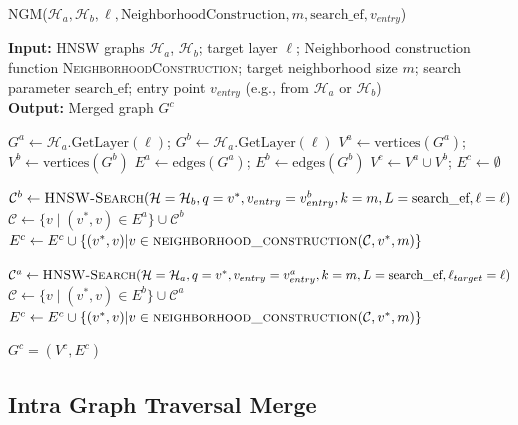 \documentclass{article}
\begin{document}
\begin{algorithm}
\caption{\textsc{NGM}($\mathcal{H}_a, \mathcal{H}_b, \ell, \text{NeighborhoodConstruction}, m, \text{search\_ef}, v_{entry}$)}\label{alg:merge_naive}
\textbf{Input:} HNSW graphs $\mathcal{H}_a$, $\mathcal{H}_b$; target layer $\ell$; Neighborhood construction function \textsc{NeighborhoodConstruction}; target neighborhood size $m$; search parameter $\text{search\_ef}$; entry point $v_{entry}$ (e.g., from $\mathcal{H}_a$ or $\mathcal{H}_b$) \\
\textbf{Output:} Merged graph $G^c$
\begin{algorithmic}[1]
\State $G^a \gets \mathcal{H}_a\text{.GetLayer}(\ell) $; $G^b \gets\mathcal{H}_a\text{.GetLayer}(\ell)$ 
\State $V^a \gets \text{vertices}(G^a)$; $V^b \gets \text{vertices}(G^b)$
\State $E^a \gets \text{edges}(G^a)$; $E^b \gets \text{edges}(G^b)$
\State $V^c \gets V^a \cup V^b$; $E^c \gets \emptyset$ 

    \State $\mathcal{C}^b \gets \textsc{HNSW-Search}(\mathcal{H}=\mathcal{H}_b, q=v^*, v_{entry}=v_{entry}^b, k=m, L=\text{search\_ef}, \ell=\ell)$ 
    \State $\mathcal{C} \gets \{v \mid (v^*, v) \in E^a \} \cup \mathcal{C}^b$  
    \State $E^c \gets E^c \cup \{(v^*, v) | v \in \textsc{neighborhood\_construction}(\mathcal{C}, v^*, m)\}$
\EndFor

    \State $\mathcal{C}^a \gets \textsc{HNSW-Search}(\mathcal{H}=\mathcal{H}_a, q=v^*, v_{entry}=v_{entry}^a, k=m, L=\text{search\_ef}, \ell_{target}=\ell)$ 
    \State $\mathcal{C} \gets \{v \mid (v^*, v) \in E^b \} \cup \mathcal{C}^a$  
    \State $E^c \gets E^c \cup \{(v^*, v) | v \in \textsc{neighborhood\_construction}(\mathcal{C}, v^*, m)\}$
\EndFor

\State \Return $G^c = (V^c, E^c)$
\end{algorithmic}
\end{algorithm}

\subsection{Intra Graph Traversal Merge}
\end{document}
